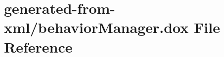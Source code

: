 \hypertarget{behaviorManager_8dox}{}\section{generated-\/from-\/xml/behavior\+Manager.dox File Reference}
\label{behaviorManager_8dox}
